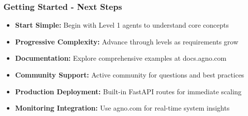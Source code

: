 \begin{frame}[fragile]\frametitle{Getting Started - Next Steps}
      \begin{itemize}
	\item \textbf{Start Simple:} Begin with Level 1 agents to understand core concepts
	\item \textbf{Progressive Complexity:} Advance through levels as requirements grow
	\item \textbf{Documentation:} Explore comprehensive examples at docs.agno.com
	\item \textbf{Community Support:} Active community for questions and best practices
	\item \textbf{Production Deployment:} Built-in FastAPI routes for immediate scaling
	\item \textbf{Monitoring Integration:} Use agno.com for real-time system insights
	  \end{itemize}
\end{frame}